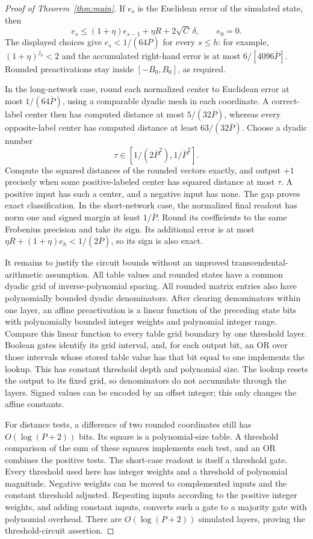 \documentclass[11pt]{article}
\theoremstyle{remark}
\begin{document}
\begin{proof}[Proof of Theorem~\ref{thm:main}]
If $e_s$ is the Euclidean error of the simulated state, then
\[
 e_s\le(1+\eta)e_{s-1}+\eta R+2\sqrt C\,\delta,
 \qquad e_0=0.
\]
The displayed choices give $e_s<1/(64\overline P)$ for every
$s\le h$: for example, $(1+\eta)^{j_0}<2$ and the accumulated
right-hand error is at most
$6/[4096\overline P]$. Rounded preactivations stay inside
$[-B_0,B_0]$, as required.

In the long-network case, round each normalized center to Euclidean
error at most $1/(64\overline P)$, using a comparable dyadic mesh
in each coordinate. A correct-label center then has computed distance
at most $5/(32\overline P)$, whereas every opposite-label center has
computed distance at least $63/(32\overline P)$. Choose a dyadic number
\[
 \tau\in[1/(2\overline P^2),1/\overline P^2].
\]
Compute the squared distances of the rounded vectors exactly, and
output $+1$ precisely when some positive-labeled center has squared
distance at most $\tau$. A positive input has such a center, and a
negative input has none. The gap proves exact classification.
In the short-network case, the normalized final readout has norm one
and signed margin at least $1/\overline P$. Round its coefficients
to the same Frobenius precision and take its sign. Its additional
error is at most $\eta R+(1+\eta)e_h<1/(2\overline P)$, so its
sign is also exact.

It remains to justify the circuit bounds without an unproved
transcendental-arithmetic assumption. All table values and rounded
states have a common dyadic grid of inverse-polynomial spacing.
All rounded matrix entries also have polynomially bounded dyadic
denominators. After clearing denominators within one layer, an affine
preactivation is a linear function of the preceding state bits with
polynomially bounded integer weights and polynomial integer range.
Compare this linear function to every table grid boundary by one
threshold layer. Boolean gates identify its grid interval, and, for
each output bit, an OR over those intervals whose stored table value
has that bit equal to one implements the lookup. This has constant
threshold depth and polynomial size. The lookup resets the output to
its fixed grid, so denominators do not accumulate through the layers.
Signed values can be encoded by an offset integer; this only changes
the affine constants.

For distance tests, a difference of two rounded coordinates still
has $O(\log(P+2))$ bits. Its square is a polynomial-size table.
A threshold comparison of the sum of these squares implements each
test, and an OR combines the positive tests. The short-case readout
is itself a threshold gate. Every threshold used here has integer
weights and a threshold of polynomial magnitude. Negative weights
can be moved to complemented inputs and the constant threshold
adjusted. Repeating inputs according to the positive integer weights,
and adding constant inputs, converts such a gate to a majority gate
with polynomial overhead. There are $O(\log(P+2))$ simulated layers,
proving the threshold-circuit assertion.


\end{proof}
\end{document}
